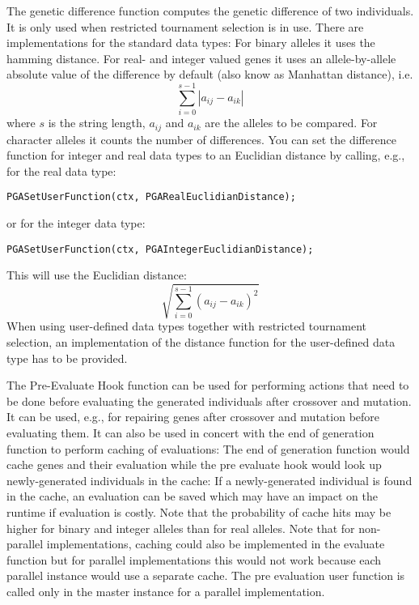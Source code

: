 \documentclass{report}
\begin{document}
The genetic difference function\label{gendiff} computes the genetic
difference of two individuals. It is only used when restricted
tournament selection is in use. There are implementations for the
standard data types: For binary alleles it uses the hamming distance.
For real- and integer valued genes it uses an allele-by-allele absolute
value of the difference by default (also know as Manhattan distance),
i.e. $$\sum_{i=0}^{s-1}|a_{ij} - a_{ik}|$$
where $s$ is the string length, $a_{ij}$ and $a_{ik}$ are the alleles to be
compared. For character alleles it counts the number of
differences. You can set the difference function for integer and real
data types to an Euclidian distance by calling, e.g., for the real data
type:

\verb+PGASetUserFunction(ctx, PGARealEuclidianDistance);+

\noindent or for the integer data type:

\verb+PGASetUserFunction(ctx, PGAIntegerEuclidianDistance);+

\noindent This will use the Euclidian distance:
$$\sqrt{\sum_{i=0}^{s-1}(a_{ij} - a_{ik})^2}$$
When using user-defined data types together with restricted
tournament selection, an implementation of the distance function for the
user-defined data type has to be provided.

The Pre-Evaluate Hook function can be used for performing actions that
need to be done before evaluating the generated individuals after
crossover and mutation. It can be used, e.g., for repairing genes after
crossover and mutation before evaluating them.
It can also be used in concert with the end of generation function to
perform caching of evaluations: The end of generation function would
cache genes and their evaluation while the pre evaluate hook would look
up newly-generated individuals in the cache: If a newly-generated
individual is found in the cache, an evaluation can be saved which may
have an impact on the runtime if evaluation is costly. Note that the
probability of cache hits may be higher for binary and integer alleles than
for real alleles. Note that for non-parallel implementations, caching
could also be implemented in the evaluate function but for parallel
implementations this would not work because each parallel instance would
use a separate cache.
The pre evaluation user function is called only in the master instance
for a parallel implementation.
\end{document}
